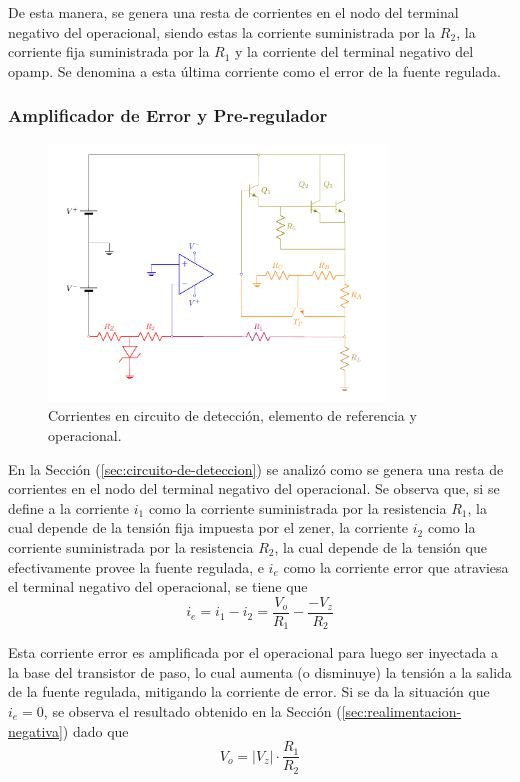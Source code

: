 De esta manera, se genera una resta de corrientes en el nodo del terminal negativo del operacional, siendo estas la corriente suministrada por la $R_2$, la corriente fija suministrada por la $R_1$ y la corriente del terminal negativo del opamp. Se denomina a esta última corriente como el error de la fuente regulada.

\subsubsection{Amplificador de Error y Pre-regulador}
\label{sec:amp-error}

\begin{figure}[H]
\centering
	\includegraphics[width=0.8\textwidth, page=8]{ImagenesEjercicio2/Regulador.pdf}
	\caption{Corrientes en circuito de detección, elemento de referencia y operacional.}
	\label{fig:amp-prereg-det-ref}
\end{figure}

En la Sección (\ref{sec:circuito-de-deteccion}) se analizó como se genera una resta de corrientes en el nodo del terminal negativo del operacional. Se observa que, si se define a la corriente $i_1$ como la corriente suministrada por la resistencia $R_1$, la cual depende de la tensión fija impuesta por el zener, la corriente $i_2$ como la corriente suministrada por la resistencia $R_2$, la cual depende de la tensión que efectivamente provee la fuente regulada, e $i_e$ como la corriente error que atraviesa el terminal negativo del operacional, se tiene que
\begin{equation}
	i_e = i_1 - i_2 = \frac{V_o}{R_1} - \frac{-V_z}{R_2}
\end{equation}

Esta corriente error es amplificada por el operacional para luego ser inyectada a la base del transistor de paso, lo cual aumenta (o disminuye) la tensión a la salida de la fuente regulada, mitigando la corriente de error. Si se da la situación que $i_e = 0$, se observa el resultado obtenido en la Sección (\ref{sec:realimentacion-negativa}) dado que
\begin{equation}
V_o = |V_z| \cdot \frac{R_1}{R_2}
\end{equation}

